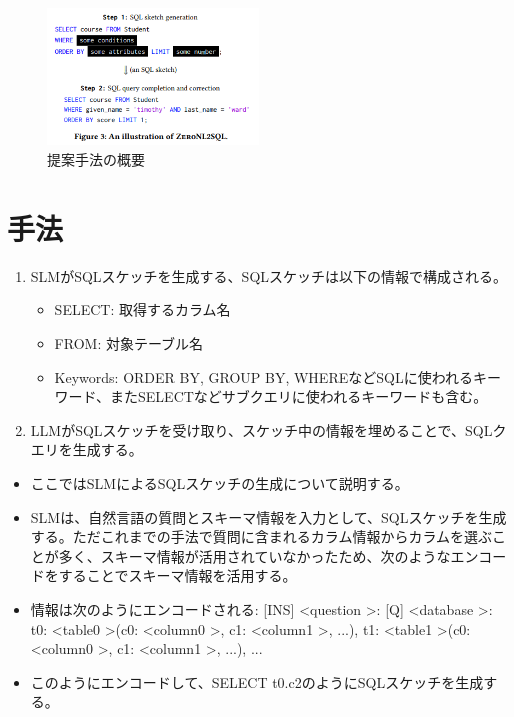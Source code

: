 \documentclass[dvipdfmx,uplatex]{jsarticle}
\theoremstyle{remark}
\newenvironment{method}[1]{
    \begin{tcolorbox}[
        colframe=green!50!black,
        colback=green!50!black!10!white,
        colbacktitle=green!50!black!40!white,
        coltitle=black,
        fonttitle=\bfseries,
        title={#1}
    ]
}{
    \end{tcolorbox}
}
\begin{document}
\begin{figure}
    \centering
    \includegraphics[width=0.5\textwidth]{img/text2sql-with-slm-and-llm/overview.png}
    \caption{提案手法の概要}
    \label{fig:overview}
\end{figure}

\section{手法}
\begin{method}{Overview}
\begin{enumerate}
    \item SLMがSQLスケッチを生成する、SQLスケッチは以下の情報で構成される。
    \begin{itemize}
        \item SELECT: 取得するカラム名
        \item FROM: 対象テーブル名
        \item Keywords: ORDER BY, GROUP BY, WHEREなどSQLに使われるキーワード、またSELECTなどサブクエリに使われるキーワードも含む。
    \end{itemize}
    \item LLMがSQLスケッチを受け取り、スケッチ中の情報を埋めることで、SQLクエリを生成する。
\end{enumerate}
\end{method}

\begin{method}{SQLスケッチの生成}
\begin{itemize}
    \item ここではSLMによるSQLスケッチの生成について説明する。
    \item SLMは、自然言語の質問とスキーマ情報を入力として、SQLスケッチを生成する。ただこれまでの手法で質問に含まれるカラム情報からカラムを選ぶことが多く、スキーマ情報が活用されていなかったため、次のようなエンコードをすることでスキーマ情報を活用する。
    \item 情報は次のようにエンコードされる: [INS] \textless question \textgreater : [Q] \textless database \textgreater : t0: \textless table0 \textgreater (c0: \textless column0 \textgreater , c1: \textless column1 \textgreater , ...), t1: \textless table1 \textgreater (c0: \textless column0 \textgreater , c1: \textless column1 \textgreater , ...), ... 
    \item このようにエンコードして、SELECT t0.c2のようにSQLスケッチを生成する。
\end{itemize}
\end{method}
\end{document}
